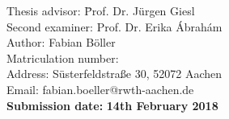\begin{center}
  \parbox{120mm}{
    \begin{large}
      \begin{tabbing}
        Thesis advisor: \hspace{1.5cm} \= Prof. Dr. Jürgen Giesl\\
        Second examiner: \> Prof. Dr. Erika Ábrahám\\[1cm]
        Author:\> Fabian Böller\\ %
        Matriculation number:\\
        Address:\> Süsterfeldstraße 30, 52072 Aachen\\
        Email:\> fabian.boeller@rwth-aachen.de\\
        \textbf{Submission date:} \> \textbf{14th February 2018}\\
      \end{tabbing}
    \end{large}
  }
  
\end{center}
